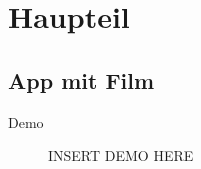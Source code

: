 \documentclass[aspectratio=169]{beamer}
\begin{document}
\section{Haupteil}
\subsection{App mit Film}
\begin{frame}[plain]{Demo}
    \begin{figure}[h]
        \centering
        INSERT DEMO HERE
    \end{figure}
\end{frame}
\end{document}
